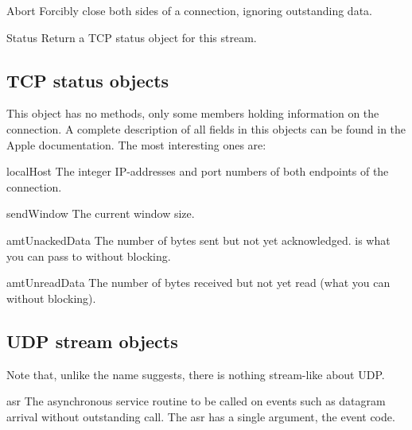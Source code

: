 \begin{funcdesc}{Abort}{}
Forcibly close both sides of a connection, ignoring outstanding data.
\end{funcdesc}

\begin{funcdesc}{Status}{}
Return a TCP status object for this stream.
\end{funcdesc}

\subsection{TCP status objects}
This object has no methods, only some members holding information on
the connection. A complete description of all fields in this objects
can be found in the Apple documentation. The most interesting ones are:

\renewcommand{\indexsubitem}{(TCP status method)}
\begin{datadesc}{localHost}
The integer IP-addresses and port numbers of both endpoints of the
connection. 
\end{datadesc}

\begin{datadesc}{sendWindow}
The current window size.
\end{datadesc}

\begin{datadesc}{amtUnackedData}
The number of bytes sent but not yet acknowledged.  is what you can pass to  without blocking.
\end{datadesc}

\begin{datadesc}{amtUnreadData}
The number of bytes received but not yet read (what you can 
without blocking).
\end{datadesc}



\subsection{UDP stream objects}
Note that, unlike the name suggests, there is nothing stream-like
about UDP.

\renewcommand{\indexsubitem}{(UDP stream method)}

\begin{datadesc}{asr}
The asynchronous service routine to be called on events such as
datagram arrival without outstanding  call. The asr has a
single argument, the event code.
\end{datadesc}

